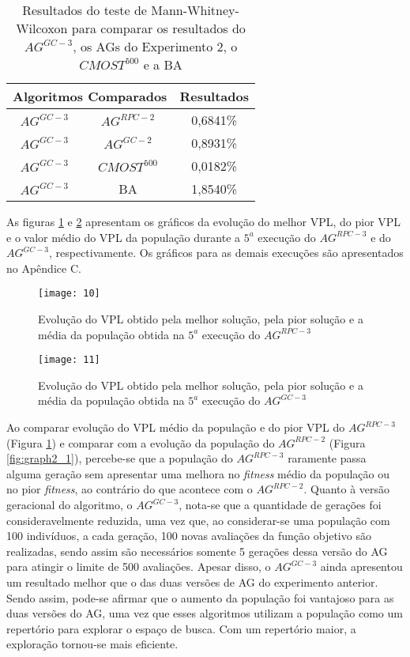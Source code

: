 \begin{table}[H]
\centering
\caption{Resultados do teste de Mann-Whitney-Wilcoxon para comparar os resultados do $AG^{GC-3}$, os AGs do Experimento 2, o $CMOST^{500}$ e a BA}
\label{tab:mw3_2}
\begin{tabular}{|c|c|c|}
\hline
\multicolumn{2}{|c|}{Algoritmos Comparados} & Resultados \\ \hline
$AG^{GC-3}$ & $AG^{RPC-2}$ & 0,6841\% \\ \hline
$AG^{GC-3}$ & $AG^{GC-2}$ & 0,8931\% \\ \hline
$AG^{GC-3}$ & $CMOST^{500}$ & 0,0182\% \\ \hline
$AG^{GC-3}$ & BA & 1,8540\% \\ \hline

\end{tabular}
\end{table}

As figuras \ref{fig:graph3_1} e \ref{fig:graph3_2} apresentam os gráficos da evolução do melhor VPL, do pior VPL e o valor médio do VPL da população durante a $5^a$ execução do $AG^{RPC-3}$ e do $AG^{GC-3}$, respectivamente. Os gráficos para as demais execuções são apresentados no Apêndice C. 

\begin{figure}[H]
\centering
\texttt{[image: 10]}
\caption{ Evolução do VPL obtido pela melhor solução, pela pior solução e a média da população obtida na $5^a$ execução do $AG^{RPC-3}$}
\label{fig:graph3_1}
\end{figure}

\begin{figure}[H]
\centering
\texttt{[image: 11]}
\caption{Evolução do VPL obtido pela melhor solução, pela pior solução e a média da população obtida na $5^a$ execução do $AG^{GC-3}$}
\label{fig:graph3_2}
\end{figure}

Ao comparar evolução do VPL médio da população e do pior VPL do $AG^{RPC-3}$ (Figura \ref{fig:graph3_1}) e comparar com a evolução da população do $AG^{RPC-2}$ (Figura \ref{fig:graph2_1}), percebe-se que a população do $AG^{RPC-3}$ raramente passa alguma geração sem apresentar uma melhora no \textit{fitness} médio da população ou no pior \textit{fitness}, ao contrário do que acontece com o $AG^{RPC-2}$. Quanto à versão geracional do algoritmo, o $AG^{GC-3}$, nota-se que a quantidade de gerações foi consideravelmente reduzida, uma vez que, ao considerar-se uma população com 100 indivíduos, a cada geração, 100 novas avaliações da função objetivo são realizadas, sendo assim são necessários somente 5 gerações dessa versão do AG para atingir o limite de 500 avaliações. Apesar disso, o $AG^{GC-3}$ ainda apresentou um resultado melhor que o das duas versões de AG do experimento anterior. Sendo assim, pode-se afirmar que o aumento da população foi vantajoso para as duas versões do AG, uma vez que esses algoritmos utilizam a população como um repertório para explorar o espaço de busca. Com um repertório maior, a exploração tornou-se mais eficiente.

